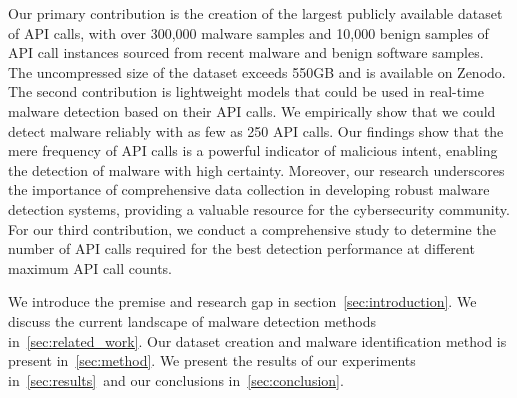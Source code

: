 Our primary contribution is the creation of the largest publicly available dataset of API calls, with over 300,000 malware samples and 10,000 benign samples of API call instances sourced from recent malware and benign software samples. 
The uncompressed size of the dataset exceeds 550GB and is available on Zenodo.
The second contribution is lightweight models that could be used in real-time malware detection based on their API calls.
We empirically show that we could detect malware reliably with as few as 250 API calls.
Our findings show that the mere frequency of API calls is a powerful indicator of malicious intent, enabling the detection of malware with high certainty.
Moreover, our research underscores the importance of comprehensive data collection in developing robust malware detection systems, providing a valuable resource for the cybersecurity community.
For our third contribution, we conduct a comprehensive study to determine the number of API calls required for the best detection performance at different maximum API call counts.

We introduce the premise and research gap in section~\autoref{sec:introduction}.
We discuss the current landscape of malware detection methods in~\autoref{sec:related_work}.
Our dataset creation and malware identification method is present in~\autoref{sec:method}. We present the results of our experiments in~\autoref{sec:results}~and our conclusions in~\autoref{sec:conclusion}.